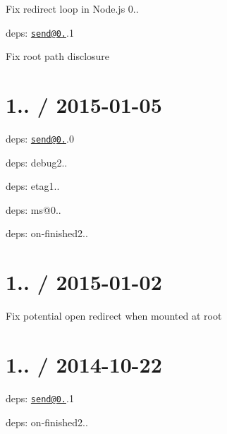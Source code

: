 \begin{DoxyItemize}
\item Fix redirect loop in Node.\+js 0..
\item deps\+: \href{mailto:send@0.11}{\tt send@0.}.1
\begin{DoxyItemize}
\item Fix root path disclosure
\end{DoxyItemize}
\end{DoxyItemize}

\section*{1.. / 2015-\/01-\/05 }


\begin{DoxyItemize}
\item deps\+: \href{mailto:send@0.11}{\tt send@0.}.0
\begin{DoxyItemize}
\item deps\+: debug2..
\item deps\+: etag1..
\item deps\+: ms@0..
\item deps\+: on-\/finished2..
\end{DoxyItemize}
\end{DoxyItemize}

\section*{1.. / 2015-\/01-\/02 }


\begin{DoxyItemize}
\item Fix potential open redirect when mounted at root
\end{DoxyItemize}

\section*{1.. / 2014-\/10-\/22 }


\begin{DoxyItemize}
\item deps\+: \href{mailto:send@0.10}{\tt send@0.}.1
\begin{DoxyItemize}
\item deps\+: on-\/finished2..
\end{DoxyItemize}
\end{DoxyItemize}

